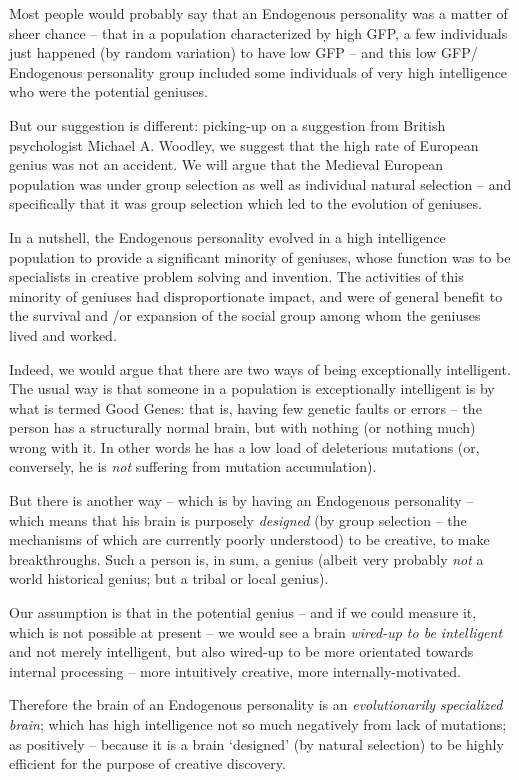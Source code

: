 \documentclass[
]{book}
\begin{document}
Most people would probably say that an Endogenous personality was a matter of sheer chance -- that in a population characterized by high GFP, a few individuals just happened (by random variation) to have low GFP -- and this low GFP/ Endogenous personality group included some individuals of very high intelligence who were the potential geniuses.

But our suggestion is different: picking-up on a suggestion from British psychologist Michael A. Woodley, we suggest that the high rate of European genius was not an accident. We will argue that the Medieval European population was under group selection as well as individual natural selection -- and specifically that it was group selection which led to the evolution of geniuses.

In a nutshell, the Endogenous personality evolved in a high intelligence population to provide a significant minority of geniuses, whose function was to be specialists in creative problem solving and invention. The activities of this minority of geniuses had disproportionate impact, and were of general benefit to the survival and /or expansion of the social group among whom the geniuses lived and worked.

Indeed, we would argue that there are two ways of being exceptionally intelligent. The usual way is that someone in a population is exceptionally intelligent is by what is termed Good Genes: that is, having few genetic faults or errors -- the person has a structurally normal brain, but with nothing (or nothing much) wrong with it. In other words he has a low load of deleterious mutations (or, conversely, he is \emph{not} suffering from mutation accumulation).

But there is another way -- which is by having an Endogenous personality -- which means that his brain is purposely \emph{designed} (by group selection -- the mechanisms of which are currently poorly understood) to be creative, to make breakthroughs. Such a person is, in sum, a genius (albeit very probably \emph{not} a world historical genius; but a tribal or local genius).

Our assumption is that in the potential genius -- and if we could measure it, which is not possible at present -- we would see a brain \emph{wired-up to be intelligent} and not merely intelligent, but also wired-up to be more orientated towards internal processing -- more intuitively creative, more internally-motivated.

Therefore the brain of an Endogenous personality is an \emph{evolutionarily specialized brain}; which has high intelligence not so much negatively from lack of mutations; as positively -- because it is a brain `designed' (by natural selection) to be highly efficient for the purpose of creative discovery.
\end{document}
